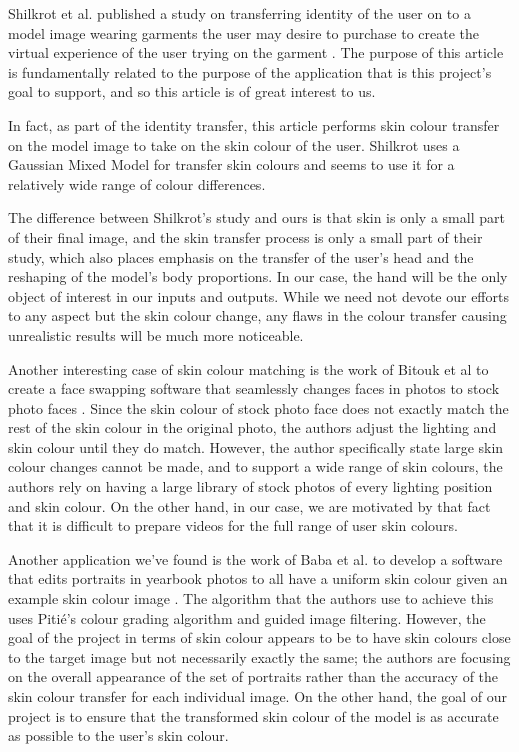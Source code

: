 Shilkrot et al. published a study on transferring identity of the user on to a model image wearing garments the user may desire to purchase to create the virtual experience of the user trying on the garment \cite{shilkrot_2013_garment}. The purpose of this article is fundamentally related to the purpose of the application that is this project's goal to support, and so this article is of great interest to us. 

In fact, as part of the identity transfer, this article performs skin colour transfer on the model image to take on the skin colour of the user. Shilkrot uses a Gaussian Mixed Model for transfer skin colours and seems to use it for a relatively wide range of colour differences.

The difference between Shilkrot's study and ours is that skin is only a small part of their final image, and the skin transfer process is only a small part of their study, which also places emphasis on the transfer of the user's head and the reshaping of the model's body proportions. In our case, the hand will be the only object of interest in our inputs and outputs. While we need not devote our efforts to any aspect but the skin colour change, any flaws in the colour transfer causing unrealistic results will be much more noticeable. 

Another interesting case of skin colour matching is the work of Bitouk et al to create a face swapping software that seamlessly changes faces in photos to stock photo faces \cite{bitouk_2008_faceswap}. Since the skin colour of stock photo face does not exactly match the rest of the skin colour in the original photo, the authors adjust the lighting and skin colour until they do match. However, the author specifically state large skin colour changes cannot be made, and to support a wide range of skin colours, the authors rely on having a large library of stock photos of every lighting position and skin colour. On the other hand, in our case, we are motivated by that fact that it is difficult to prepare videos for the full range of user skin colours.

Another application we've found is the work of Baba et al. to develop a software that edits portraits in yearbook photos to all have a uniform skin colour given an example skin colour image \cite{baba_2015_yearbook}. The algorithm that the authors use to achieve this uses Pitié's colour grading algorithm and guided image filtering. However, the goal of the project in terms of skin colour appears to be to have skin colours close to the target image but not necessarily exactly the same; the authors are focusing on the overall appearance of the set of portraits rather than the accuracy of the skin colour transfer for each individual image. On the other hand, the goal of our project is to ensure that the transformed skin colour of the model is as accurate as possible to the user's skin colour.

